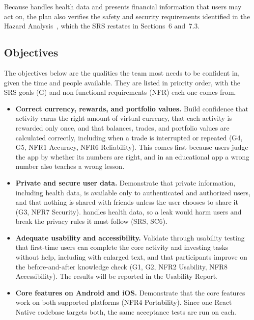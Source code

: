 \documentclass[12pt, titlepage]{article}
\begin{document}
Because \progname{} handles health data and presents financial information
that users may act on, the plan also verifies the safety and security
requirements identified in the Hazard Analysis~\citep[HA;][]{HA}, which the
SRS restates in Sections~6 and~7.3.

\subsection{Objectives}

The objectives below are the qualities the team most needs to be confident in,
given the time and people available. They are listed in priority order, with
the SRS goals (G) and non-functional requirements (NFR) each one comes from.

\begin{itemize}
  \item \textbf{Correct currency, rewards, and portfolio values.} Build
    confidence that activity earns the right amount of virtual currency, that
    each activity is rewarded only once, and that balances, trades, and
    portfolio values are calculated correctly, including when a trade is
    interrupted or repeated (G4, G5, NFR1 Accuracy, NFR6 Reliability). This
    comes first because users judge the app by whether its numbers are right,
    and in an educational app a wrong number also teaches a wrong lesson.
  \item \textbf{Private and secure user data.} Demonstrate that private
    information, including health data, is available only to authenticated and
    authorized users, and that nothing is shared with friends unless the user
    chooses to share it (G3, NFR7 Security). \progname{} handles health data,
    so a leak would harm users and break the privacy rules it must follow
    (SRS, SC6).
  \item \textbf{Adequate usability and accessibility.} Validate through
    usability testing that first-time users can complete the core activity and
    investing tasks without help, including with enlarged text, and that
    participants improve on the before-and-after knowledge check (G1, G2, NFR2
    Usability, NFR8 Accessibility). The results will be reported in the
    Usability Report.
  \item \textbf{Core features on Android and iOS.} Demonstrate that the core
    features work on both supported platforms (NFR4 Portability). Since one
    React Native codebase targets both, the same acceptance tests are run on
    each.
\end{itemize}
\end{document}
